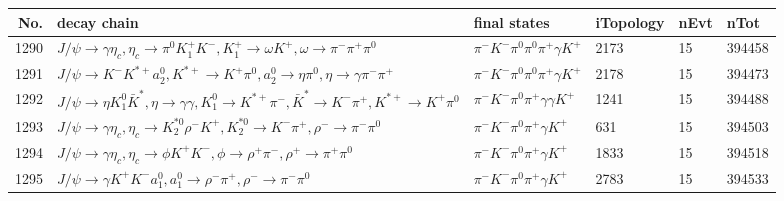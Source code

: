 \begin{table}[htbp] 
\begin{center}
\begin{small}
\begin{tabular}{rlllll}\hline\hline
 No. & decay chain & final states &  iTopology & nEvt & nTot \\\hline
1290&$J/\psi       \rightarrow \gamma       \eta_{c}    , \eta_{c}     \rightarrow \pi^{0}        K_1^{+}        K^{-}          , K_1^{+}         \rightarrow \omega         K^{+}          , \omega          \rightarrow \pi^{-}        \pi^{+}        \pi^{0}        $&$\pi^{-}        K^{-}          \pi^{0}        \pi^{0}        \pi^{+}        \gamma       K^{+}          $& 2173&   15&394458\\
1291&$J/\psi       \rightarrow K^{-}          K^{*+}         a_{2}^{0}      , K^{*+}          \rightarrow K^{+}          \pi^{0}        , a_{2}^{0}       \rightarrow \eta          \pi^{0}        , \eta           \rightarrow \gamma       \pi^{-}        \pi^{+}        $&$\pi^{-}        K^{-}          \pi^{0}        \pi^{0}        \pi^{+}        \gamma       K^{+}          $& 2178&   15&394473\\
1292&$J/\psi       \rightarrow \eta          K_1^{0}        \bar{K}^{*}   , \eta           \rightarrow \gamma       \gamma       , K_1^{0}         \rightarrow K^{*+}         \pi^{-}        , \bar{K}^{*}    \rightarrow K^{-}          \pi^{+}        , K^{*+}          \rightarrow K^{+}          \pi^{0}        $&$\pi^{-}        K^{-}          \pi^{0}        \pi^{+}        \gamma       \gamma       K^{+}          $& 1241&   15&394488\\
1293&$J/\psi       \rightarrow \gamma       \eta_{c}    , \eta_{c}     \rightarrow K_2^{*0}       \rho^{-}      K^{+}          , K_2^{*0}        \rightarrow K^{-}          \pi^{+}        , \rho^{-}       \rightarrow \pi^{-}        \pi^{0}        $&$\pi^{-}        K^{-}          \pi^{0}        \pi^{+}        \gamma       K^{+}          $&  631&   15&394503\\
1294&$J/\psi       \rightarrow \gamma       \eta_{c}    , \eta_{c}     \rightarrow \phi           K^{+}          K^{-}          , \phi            \rightarrow \rho^{+}      \pi^{-}        , \rho^{+}       \rightarrow \pi^{+}        \pi^{0}        $&$\pi^{-}        K^{-}          \pi^{0}        \pi^{+}        \gamma       K^{+}          $& 1833&   15&394518\\
1295&$J/\psi       \rightarrow \gamma       K^{+}          K^{-}          a_{1}^{0}      , a_{1}^{0}       \rightarrow \rho^{-}      \pi^{+}        , \rho^{-}       \rightarrow \pi^{-}        \pi^{0}        $&$\pi^{-}        K^{-}          \pi^{0}        \pi^{+}        \gamma       K^{+}          $& 2783&   15&394533\\

\end{tabular}
\end{small}
\end{center}
\end{table}
